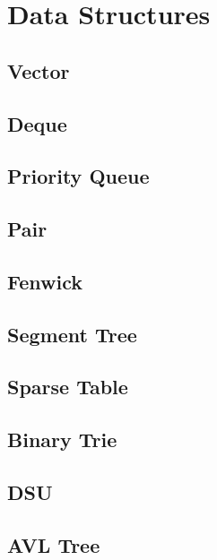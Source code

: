 \documentclass{article}
\begin{document}
\tableofcontents

\pagebreak

%

\section{Data Structures}
\subsection{Vector}

\pagebreak
\subsection{Deque}

\pagebreak
\subsection{Priority Queue}

\pagebreak
\subsection{Pair}

\pagebreak
\subsection{Fenwick}

\pagebreak
\subsection{Segment Tree}

\pagebreak
\subsection{Sparse Table}

\pagebreak
\subsection{Binary Trie}

\pagebreak
\subsection{DSU}

\pagebreak
\subsection{AVL Tree}

\pagebreak
\end{document}
